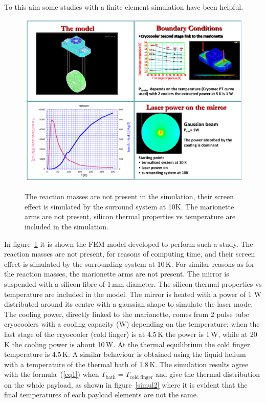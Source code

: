 To this aim some studies with a finite element simulation have been helpful. 
\begin{figure}
\begin{center}
\includegraphics[scale=0.5]{Sec_Suspensions/Figures/Simul.pdf}\\
\caption{The reaction masses are not present in the simulation, their screen effect is simulated by the surround system at 10K.
The marionette arms are not present, silicon thermal properties vs temperature are included in the simulation.}
\label{simul}
\end{center}
\end{figure}
In figure~\ref{simul} it is shown the FEM model developed to perform such a study. The reaction masses are not present, for reasons of computing time, and their screen effect is simulated by the surrounding system at 10\,K. For similar reasons as for the reaction masses, the marionette arms are not present.
The mirror is suspended with a silicon fibre of 1\,mm diameter. The  silicon thermal properties vs temperature are included in the model. The mirror is heated with a power of 1 W distributed around its centre with a gaussian shape to simulate the laser mode. 
The cooling power, directly linked to the marionette, comes from 2 pulse tube cryocoolers with a cooling capacity (W) depending on the temperature: when the last stage of the cryocooler (cold finger) is at 4.5\,K the power is 1\,W, while at 20\,K the cooling power is about 10\,W. At the thermal equilibrium the cold finger temperature is 4.5\,K. A similar behaviour is obtained using the liquid helium with a temperature of the thermal bath of 1.8\,K. 
The simulation results agree with the formula~(\ref{eq1}) when $T_\text{bath}=T_\text{cold finger}$ and give the thermal distribution on the whole payload, as shown in figure~\ref{simul2} where it is evident that the final temperatures of each payload elements are not the same.
 
